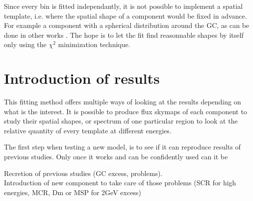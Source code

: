 Since every bin is fitted independantly, it is not possible to implement a spatial template, i.e. where the spatial shape of a component would be fixed in advance. For example a component with a spherical distribution around the GC, as can be done in other works . The hope is to let the fit find reasonnable shapes by itself only using the $\chi ^2$ minimization technique.\\






\section{Introduction of results}

This fitting method offers multiple ways of looking at the results depending on what is the interest. It is possible to produce flux skymaps of each component to study their spatial shapes, or spectrum of one particular region to look at the relative quantity of every template at different energies.

The first step when testing a new model, is to see if it can reproduce results of previous studies. Only once it works and can be confidently used can it be 


Recretion of previous studies (GC excess, problems).\\
Introduction of new component to take care of those problems (SCR for high energies, MCR, Dm or MSP for 2GeV excess)


